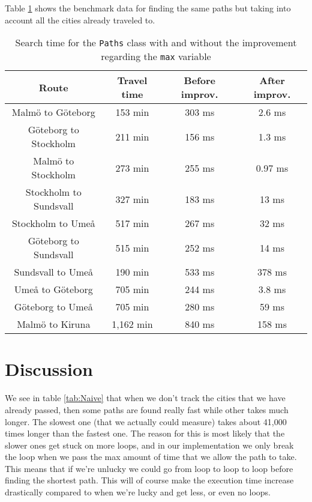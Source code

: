 \documentclass[a4paper,11pt]{article}
\begin{document}
Table \ref{tab:Paths} shows the benchmark data for finding the same paths but taking into account all the cities already traveled to.
\begin{table}[h!]
    \begin{center}
        \caption{Search time for the {\tt Paths} class with and without the improvement regarding the
                {\tt max} variable}
        \label{tab:Paths}
        \begin{tabular}{|c|c|c|c|}
            \hline
            \textbf{Route}         & \textbf{Travel time} & \textbf{Before improv.} & \textbf{After improv.} \\
            \hline
            Malmö to Göteborg      & 153 min              & 303 ms                  & 2.6 ms                 \\
            Göteborg to Stockholm  & 211 min              & 156 ms                  & 1.3 ms                 \\
            Malmö to Stockholm     & 273 min              & 255  ms                 & 0.97 ms                \\
            Stockholm to Sundsvall & 327 min              & 183  ms                 & 13 ms                  \\
            Stockholm to Umeå      & 517 min              & 267  ms                 & 32 ms                  \\
            Göteborg to Sundsvall  & 515 min              & 252  ms                 & 14 ms                  \\
            Sundsvall to Umeå      & 190 min              & 533  ms                 & 378 ms                 \\
            Umeå to Göteborg       & 705 min              & 244  ms                 & 3.8 ms                 \\
            Göteborg to Umeå       & 705 min              & 280  ms                 & 59 ms                  \\
            Malmö to Kiruna        & 1,162 min            & 840  ms                 & 158 ms                 \\
            \hline
        \end{tabular}
    \end{center}
\end{table}

\FloatBarrier
\section{Discussion}
We see in table \ref{tab:Naive} that when we don't track the cities that we have already passed, then some paths are found really fast while other takes much longer.
The slowest one (that we actually could measure) takes about 41,000 times longer than the fastest one. The reason for this is most likely that the slower ones get
stuck on more loops, and in our implementation we only break the loop when we pass the max amount of time that we allow the path to take. This means that if we're
unlucky we could go from loop to loop to loop before finding the shortest path. This will of course make the execution time increase drastically compared to when
we're lucky and get less, or even no loops.
\end{document}
